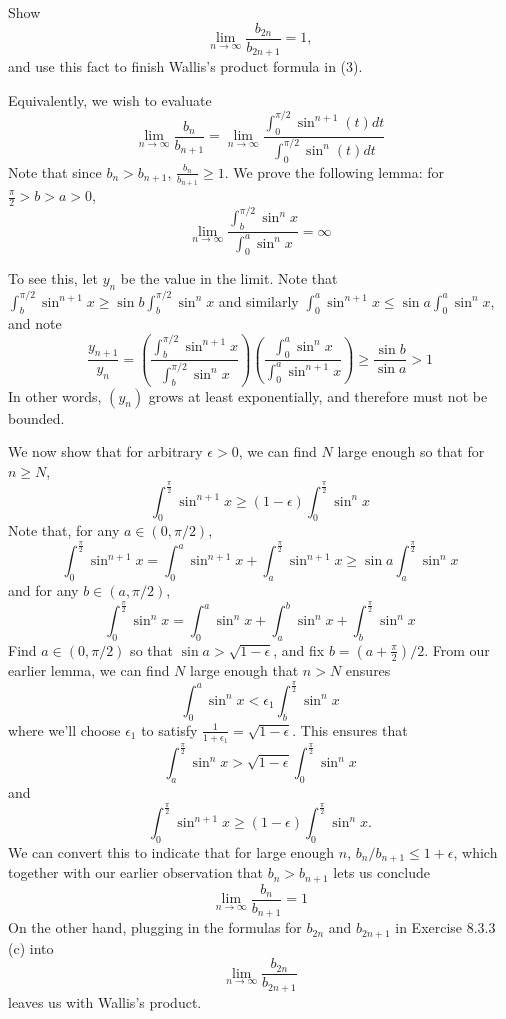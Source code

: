 \begin{exercise}
Show
\[\lim_{n \to \infty} \frac{b_{2n}}{b_{2n+1}} = 1,\]
and use this fact to finish Wallis's product formula in (3).
\end{exercise}
\begin{solution}
    Equivalently, we wish to evaluate
\[\lim_{n \to \infty} \frac{b_n}{b_{n+1}} = \lim_{n \to \infty} \frac{\int^{\pi/2}_0 \sin^{n+1} (t) dt}{\int^{\pi/2}_0 \sin^n (t) dt}\]
Note that since \(b_n > b_{n+1}\), \(\frac{b_n}{b_{n+1}} \geq 1\).
We prove the following lemma: for \(\frac{\pi}{2} > b > a > 0\),
\[\lim_{n \to \infty} \frac{\int^{\pi/2}_b \sin^n x}{\int^a_0 \sin^n x} = \infty\]

To see this, let \(y_n\) be the value in the limit. Note that \(\int^{\pi/2}_b \sin^{n+1}x \geq \sin b \int^{\pi/2}_b \sin^n x\) and similarly \(\int_0^a \sin^{n+1}x \leq \sin a \int_0^a \sin^n x\), and note
\[\frac{y_{n+1}}{y_n} = \left(\frac{\int^{\pi/2}_b \sin^{n+1} x}{\int^{\pi/2}_b \sin^{n} x}\right) \left(\frac{\int_0^a \sin^{n} x}{\int_0^a \sin^{n+1} x}\right) \geq \frac{\sin b}{\sin a}> 1\]
In other words, \((y_n)\) grows at least exponentially, and therefore must not be bounded.

We now show that for arbitrary \(\epsilon > 0\), we can find \(N\) large enough so that for \(n \geq N\),
\[\int^\frac{\pi}{2}_0 \sin^{n+1} x \geq (1-\epsilon) \int_0^\frac{\pi}{2} \sin^n x\]
Note that, for any \(a \in (0, \pi / 2)\),
\[\int^\frac{\pi}{2}_0 \sin^{n+1} x = \int_0^a \sin^{n+1} x + \int_a^\frac{\pi}{2} \sin^{n+1} x \geq \sin a \int_a^\frac{\pi}{2} \sin^n x\]
and for any \(b \in (a, \pi/2)\),
\[\int_0^\frac{\pi}{2} \sin^n x = \int_0^a \sin^n x + \int_a^b \sin^n x + \int_b^\frac{\pi}{2}\sin^n x\]
Find \(a \in (0, \pi/2)\) so that \(\sin a > \sqrt{1-\epsilon}\), and fix \(b = \left(a + \frac{\pi}{2}\right)/2\). From our earlier lemma, we can find \(N\) large enough that \(n > N\) ensures
\[\int_0^a \sin^n x < \epsilon_1 \int_b^\frac{\pi}{2}\sin^n x\]
where we'll choose \(\epsilon_1\) to satisfy \(\frac{1}{1 + \epsilon_1} = \sqrt{1 - \epsilon}\). This ensures that
\[\int^\frac{\pi}{2}_a \sin^n x > \sqrt{1-\epsilon} \int_0^\frac{\pi}{2} \sin^n x\]
and
\[\int^\frac{\pi}{2}_0 \sin^{n+1} x \geq (1-\epsilon) \int_0^\frac{\pi}{2} \sin^n x.\]
We can convert this to indicate that for large enough \(n\), \(b_n / b_{n+1} \leq 1 + \epsilon\), which together with our earlier observation that \(b_n > b_{n+1}\) lets us conclude
\[\lim_{n \to \infty} \frac{b_n}{b_{n+1}} = 1\]
On the other hand, plugging in the formulas for \(b_{2n}\) and \(b_{2n+1}\) in Exercise 8.3.3 (c) into
\[\lim_{n \to \infty} \frac{b_{2n}}{b_{2n+1}}\]
leaves us with Wallis's product.
\end{solution}

